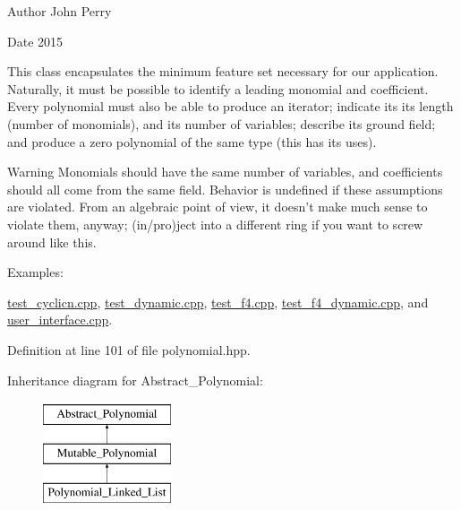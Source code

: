 \begin{DoxyAuthor}{Author}
John Perry 
\end{DoxyAuthor}
\begin{DoxyDate}{Date}
2015
\end{DoxyDate}
This class encapsulates the minimum feature set necessary for our application. Naturally, it must be possible to identify a leading monomial and coefficient. Every polynomial must also be able to produce an iterator; indicate its its length (number of monomials), and its number of variables; describe its ground field; and produce a zero polynomial of the same type (this has its uses).

\begin{DoxyWarning}{Warning}
Monomials should have the same number of variables, and coefficients should all come from the same field. Behavior is undefined if these assumptions are violated. From an algebraic point of view, it doesn't make much sense to violate them, anyway; (in/pro)ject into a different ring if you want to screw around like this. 
\end{DoxyWarning}
\begin{Desc}
\item[Examples\+: ]\par
\hyperlink{test_cyclicn_8cpp-example}{test\+\_\+cyclicn.\+cpp}, \hyperlink{test_dynamic_8cpp-example}{test\+\_\+dynamic.\+cpp}, \hyperlink{test_f4_8cpp-example}{test\+\_\+f4.\+cpp}, \hyperlink{test_f4_dynamic_8cpp-example}{test\+\_\+f4\+\_\+dynamic.\+cpp}, and \hyperlink{user_interface_8cpp-example}{user\+\_\+interface.\+cpp}.\end{Desc}


Definition at line 101 of file polynomial.\+hpp.

Inheritance diagram for Abstract\+\_\+\+Polynomial\+:\begin{figure}[H]
\begin{center}
\leavevmode
\includegraphics[height=3.000000cm]{group__polygroup}
\end{center}
\end{figure}
